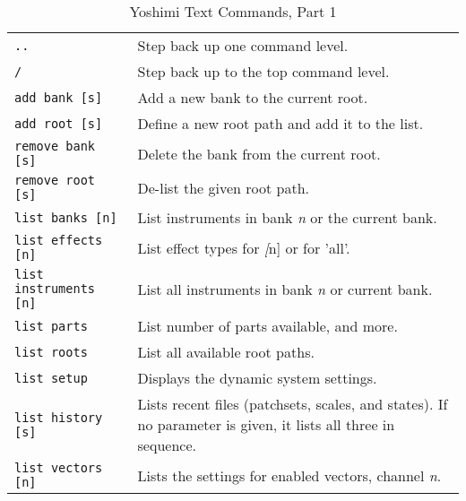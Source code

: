    \begin{table}[H]
      \centering
      \caption{Yoshimi Text Commands, Part 1}
      \label{table:yoshimi_text_commands_part_1}
      \begin{tabular}{l l}

         \texttt{..} &
            Step back up one command level. \\

         \texttt{/} &
            Step back up to the top command level. \\

         \texttt{add bank [s]} &
            Add a new bank to the current root. \\

         \texttt{add root [s]} &
            Define a new root path and add it to the list. \\

         \texttt{remove bank [s]} &
            Delete the bank from the current root. \\

         \texttt{remove root [s]} &
            De-list the given root path. \\

         \texttt{list banks [n]} &
            List instruments in bank \textsl{n} or the current bank. \\

         \texttt{list effects [n]} &
            List effect types for \textsl[n] or for 'all'.  \\

         \texttt{list instruments [n]} &
            List all instruments in bank \textsl{n} or current bank. \\

         \texttt{list parts} &
            List number of parts available, and more. \\

         \texttt{list roots} &
            List all available root paths. \\

         \texttt{list setup} &
            Displays the dynamic system settings. \\

         \texttt{list history [s]} &
            Lists recent files (patchsets, scales, and states).
            If no parameter is given, it lists all three in sequence. \\

         \texttt{list vectors [n]} &
            Lists the settings for enabled vectors, channel \textsl{n}. \\


\end{tabular}
\end{table}
